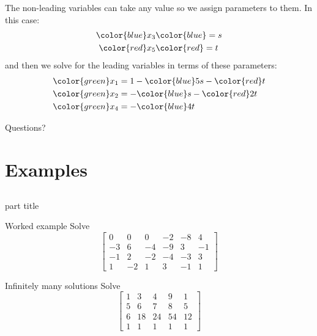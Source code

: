 \documentclass{beamer}
\begin{document}
\begin{frame}
  The non-leading variables can take any value so we assign parameters to them.\vfill
  In this case:
  \begin{align*}
    {\color{blue}x_3} &{\color{blue}= s}\\
    {\color{red}x_5} &{\color{red}= t}
  \end{align*}
  and then we solve for the leading variables in terms of these parameters:
  \begin{align*}
    {\color{green}x_1} &= 1-{\color{blue}5s}-{\color{red}t}\\
    {\color{green}x_2} &= -{\color{blue}s}-{\color{red}2t}\\
    {\color{green}x_4} &= -{\color{blue}4t}
  \end{align*}
\end{frame}

\begin{frame}
  Questions?
\end{frame}


\section{Examples}
\subsection{}

\begin{frame}
    \begin{beamercolorbox}[sep=12pt,center]{part title}
      \insertsection\par
    \end{beamercolorbox}
\end{frame}

\begin{frame}{Worked example}
  Solve
  \begin{equation*}
      \left[
        \begin{array}{rrrrr|r}
          0 & 0 & 0 & -2 & -8 & 4 \\
          -3 & 6 & -4 & -9 & 3 & -1 \\
          -1 & 2 & -2 & -4 & -3 & 3 \\
          1 & -2 & 1 & 3 & -1 & 1
        \end{array}\right] 
    \end{equation*}
\end{frame}

\begin{frame}{Infinitely many solutions}
  Solve
  \begin{equation*}
      \left[
        \begin{array}{rrrr|r}
          1 & 3 & 4 & 9 & 1 \\
          5 & 6 & 7 & 8 & 5 \\
          6 & 18 & 24 & 54 & 12 \\
          1 & 1 & 1 & 1 & 1
        \end{array}\right] 
    \end{equation*}
\end{frame}
\end{document}
